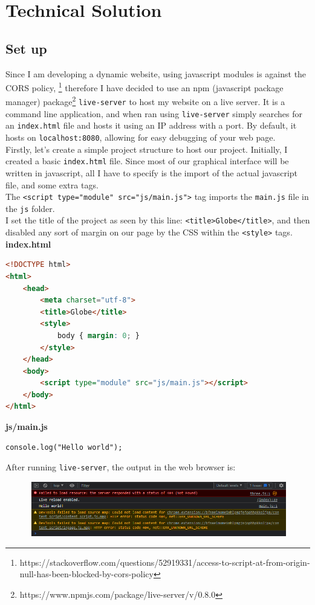 \chapter{Technical Solution}

\section{Set up}
Since I am developing a dynamic website, using javascript modules is against the CORS policy,
\footnote{https://stackoverflow.com/questions/52919331/access-to-script-at-from-origin-null-has-been-blocked-by-cors-policy}
therefore I have decided to use an npm (javascript package manager) package\footnote{https://www.npmjs.com/package/live-server/v/0.8.0} \verb|live-server| to host my website on a live server.
It is a command line application, and when ran using \verb|live-server| simply searches for an \verb|index.html| file and hosts it using an IP address with a port. By default, it hosts on \verb|localhost:8080|, allowing for easy debugging of your web page. \\
Firstly, let's create a simple project structure to host our project. Initially, I created a basic \verb|index.html| file. Since most of our graphical interface will be written in javascript, all I have to specify is the import of the actual javascript file, and some extra tags. \\
The \verb|<script type="module" src="js/main.js">| tag imports the \verb|main.js| file in the \verb|js| folder. \\
I set the title of the project as seen by this line: \verb|<title>Globe</title>|, and then disabled any sort of margin on our page by the CSS within the \verb|<style>| tags.
\newpage
\textbf{index.html}
\begin{lstlisting}[language=Html]
<!DOCTYPE html>
<html>
	<head>
		<meta charset="utf-8">
		<title>Globe</title>
		<style>
			body { margin: 0; }
		</style>
	</head>
	<body>
    	<script type="module" src="js/main.js"></script>
	</body>
</html>
\end{lstlisting}

\dotfill

\textbf{js/main.js}
\begin{lstlisting}
console.log("Hello world");
\end{lstlisting}

\dotfill

After running \verb|live-server|, the output in the web browser is: \\
\begin{figure}[h]
\centering
\includegraphics[width=0.7\linewidth]{images/setup_output}
\caption{}
\label{fig:setupoutput}
\end{figure}

